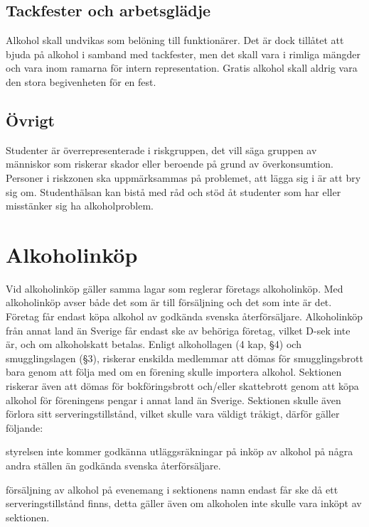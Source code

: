 \documentclass[]{dsekprotokoll}
\begin{document}
\subsection{Tackfester och arbetsglädje}
Alkohol skall undvikas som belöning till funktionärer. Det är dock tillåtet att bjuda på alkohol i samband med tackfester, men det skall vara i rimliga mängder och vara inom ramarna för intern representation. Gratis alkohol skall aldrig vara den stora begivenheten för en fest.

\subsection{Övrigt}
Studenter är överrepresenterade i riskgruppen, det vill säga gruppen av människor som riskerar skador eller beroende på grund av överkonsumtion. Personer i riskzonen ska uppmärksammas på problemet, att lägga sig i är att bry sig om. Studenthälsan kan bistå med råd och stöd åt studenter som har eller misstänker sig ha alkoholproblem.

\section{Alkoholinköp}
Vid alkoholinköp gäller samma lagar som reglerar företags alkoholinköp. Med alkoholinköp avser
både det som är till försäljning och det som inte är det. Företag får endast köpa alkohol av godkända
svenska återförsäljare. Alkoholinköp från annat land än Sverige får endast ske av behöriga företag,
vilket D-sek inte är, och om alkoholskatt betalas. Enligt alkohollagen (4 kap, §4) och smugglingslagen (§3), riskerar enskilda medlemmar att dömas för smugglingsbrott bara genom att följa med
om en förening skulle importera alkohol. Sektionen riskerar även att dömas för bokföringsbrott
och/eller skattebrott genom att köpa alkohol för föreningens pengar i annat land än Sverige. Sektionen skulle även förlora sitt serveringstillstånd, vilket skulle vara väldigt tråkigt, därför gäller
följande:

\begin{attlista}
    \item styrelsen inte kommer godkänna utläggsräkningar på inköp av alkohol på några andra ställen än godkända svenska återförsäljare.
    \item försäljning av alkohol på evenemang i sektionens namn endast får ske då ett serveringstillstånd finns, detta gäller även om alkoholen inte skulle vara inköpt av sektionen.
\end{attlista}
\end{document}
